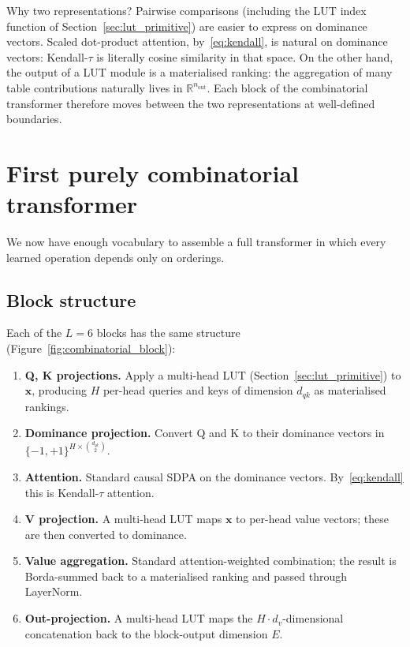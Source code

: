 \documentclass[11pt]{article}
\begin{document}
Why two representations?
Pairwise comparisons (including the LUT index function of Section~\ref{sec:lut_primitive}) are easier to express on dominance vectors.
Scaled dot-product attention, by~\eqref{eq:kendall}, is natural on dominance vectors: Kendall-$\tau$ is literally cosine similarity in that space.
On the other hand, the output of a LUT module is a materialised ranking: the aggregation of many table contributions naturally lives in $\mathbb{R}^{n_\mathrm{out}}$.
Each block of the combinatorial transformer therefore moves between the two representations at well-defined boundaries.


\section{First purely combinatorial transformer}
\label{sec:first_combinatorial}

We now have enough vocabulary to assemble a full transformer in which every learned operation depends only on orderings.

\subsection{Block structure}

Each of the $L = 6$ blocks has the same structure (Figure~\ref{fig:combinatorial_block}):
\begin{enumerate}
    \item \textbf{Q, K projections.} Apply a multi-head LUT (Section~\ref{sec:lut_primitive}) to $\mathbf{x}$, producing $H$ per-head queries and keys of dimension $d_{qk}$ as materialised rankings.
    \item \textbf{Dominance projection.} Convert Q and K to their dominance vectors in $\{-1, +1\}^{H \times \binom{d_{qk}}{2}}$.
    \item \textbf{Attention.} Standard causal SDPA on the dominance vectors. By~\eqref{eq:kendall} this is Kendall-$\tau$ attention.
    \item \textbf{V projection.} A multi-head LUT maps $\mathbf{x}$ to per-head value vectors; these are then converted to dominance.
    \item \textbf{Value aggregation.} Standard attention-weighted combination; the result is Borda-summed back to a materialised ranking and passed through LayerNorm.
    \item \textbf{Out-projection.} A multi-head LUT maps the $H \cdot d_v$-dimensional concatenation back to the block-output dimension $E$.
\end{enumerate}
\end{document}
